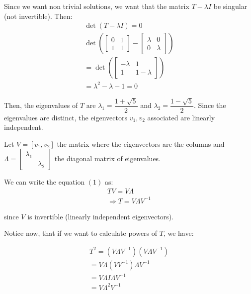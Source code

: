 \documentclass{article}
\begin{document}
Since we want non trivial solutions, we want that the matrix $T - \lambda I$ be
singular (not invertible). Then:
\begin{equation*}
    \begin{aligned}
    \det(T - \lambda I) = 0\\
    \det(\begin{bmatrix}
        0 & 1 \\
        1 & 1
    \end{bmatrix} - \begin{bmatrix}
        \lambda & 0\\
        0 & \lambda
    \end{bmatrix})\\
    =\det(\begin{bmatrix}
        -\lambda & 1\\
        1 & 1 - \lambda
    \end{bmatrix})\\
    = \lambda^2 - \lambda - 1 = 0
    \end{aligned}
\end{equation*}

Then, the eigenvalues of $T$ are $\lambda_1 = \dfrac{1 + \sqrt{5}}{2}$ and
$\lambda_2 = \dfrac{1 - \sqrt{5}}{2}$. Since the eigenvalues are distinct, the
eigenvectors $v_1, v_2$ associated are linearly independent.

Let $V = [v_1 , v_2]$ the matrix where the eigenvectors are the columns and $\Lambda = \begin{bmatrix}
    \lambda_1 & \\
    & \lambda_2
\end{bmatrix}$ the diagonal matrix of eigenvalues.

We can write the equation $(1)$ as:
\begin{equation*}
    \begin{aligned}
        TV = V\Lambda\\
        \Rightarrow T = V \Lambda V^{-1}
    \end{aligned}
\end{equation*}

since $V$ is invertible (linearly independent eigenvectors).

Notice now, that if we want to calculate powers of $T$, we have:

\begin{equation*}
    \begin{aligned}
        T^2 = (V\Lambda V^{-1})(V\Lambda V^{-1})\\
        = V\Lambda (VV^{-1})\Lambda V^{-1}\\
        = V \Lambda I \Lambda V^{-1} \\
        =V \Lambda^2 V^{-1}
    \end{aligned}
\end{equation*}
\end{document}
